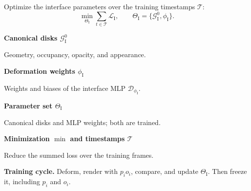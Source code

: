 \documentclass[10pt,a4paper]{article}
\newcommand{\notation}[2]{\noindent\textbf{#1}\par\nopagebreak #2\par}
\newcommand{\GI}{\mathcal G_{\mathrm I}}
\newcommand{\Def}{\mathcal D}
\newcommand{\notepair}[4]{\par\noindent
\begin{minipage}[t]{0.485\textwidth}\small\notation{#1}{#2}\end{minipage}\hfill
\begin{minipage}[t]{0.485\textwidth}\small\notation{#3}{#4}\end{minipage}\par\vspace{1pt}}
\begin{document}
Optimize the interface parameters over the training timestamps $\mathcal T$:
\begin{equation}
\boxed{\min_{\Theta_{\mathrm I}}\sum_{t\in\mathcal T}\mathcal L_{\mathrm I}},
\qquad \Theta_{\mathrm I}=\{\GI^0,\phi_{\mathrm I}\}. \tag{4}
\end{equation}
\notepair{Canonical disks $\GI^0$}{Geometry, occupancy, opacity, and appearance.}
{Deformation weights $\phi_{\mathrm I}$}{Weights and biases of the interface MLP $\Def_{\phi_{\mathrm I}}$.}
\notepair{Parameter set $\Theta_{\mathrm I}$}{Canonical disks and MLP weights; both are trained.}
{Minimization $\min$ and timestamps $\mathcal T$}{Reduce the summed loss over the training frames.}
\textbf{Training cycle.} Deform, render with $p_i o_i$, compare, and update $\Theta_{\mathrm I}$. Then freeze it, including $p_i$ and $o_i$.
\end{document}
